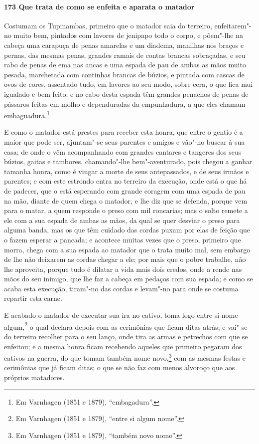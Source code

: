 \paragraph{173 Que trata de como se enfeita e aparata o matador}

Costumam os Tupinambas, primeiro que o matador saia do terreiro, enfeitarem"-no muito bem,
pintados com lavores de jenipapo todo o corpo, e põem"-lhe na cabeça uma carapuça de penas
amarelas e um diadema, manilhas nos braços e pernas, das mesmas penas, grandes ramais de
contas brancas sobraçadas, e seu rabo de penas de ema nas ancas e uma espada de pau de
ambas as mãos muito pesada, marchetada com continhas brancas de búzios, e pintada com
cascas de ovos de cores, assentado tudo, em lavores ao seu modo, sobre cera, o que fica
mui igualado e bem feito; e no cabo desta espada têm grandes penachos de penas de pássaros
feitas em molho e dependuradas da empunhadura, a que eles chamam embaguadura.\footnote{ Em
Varnhagen (1851 e 1879), ``embagadura''.}

E como o matador está prestes para receber esta honra, que entre o gentio é a maior que
pode ser, ajuntam"-se seus parentes e amigos e vão"-no buscar à sua casa; de onde o vêm
acompanhando com grandes cantares e tangeres dos seus búzios, gaitas e tambores,
chamando"-lhe bem"-aventurado, pois chegou a ganhar tamanha honra, como é vingar a morte de
seus antepassados, e de seus irmãos e parentes; e com este estrondo entra no terreiro da
execução, onde está o que há de padecer, que o está esperando com grande coragem com uma
espada de pau na mão, diante de quem chega o matador, e lhe diz que se defenda, porque vem
para o matar, a quem responde o preso com mil roncarias; mas o solto remete a ele com a
sua espada de ambas as mãos, da qual se quer desviar o preso para alguma banda, mas os que
têm cuidado das cordas puxam por elas de feição que o fazem esperar a pancada; e acontece
muitas vezes que o preso, primeiro que morra, chega com a sua espada ao matador que o
trata muito mal, sem embargo de lhe não deixarem as cordas chegar a ele; por mais que o
pobre trabalhe, não lhe aproveita, porque tudo é dilatar a vida mais dois credos, onde a
rende nas mãos do seu inimigo, que lhe faz a cabeça em pedaços com sua espada; e como se
acaba esta execução, tiram"-no das cordas e levam"-no para onde se costuma repartir esta
carne.

E acabado o matador de executar sua ira no cativo, toma logo entre si nome
algum,\footnote{ Em Varnhagen (1851 e 1879), ``entre si algum nome''.} o qual declara
depois com as cerimônias que ficam ditas atrás; e vai"-se do terreiro recolher para o seu
lanço, onde tira as armas e petrechos com que se enfeitou; e a mesma honra ficam recebendo
aqueles que primeiro pegaram dos cativos na guerra, do que tomam também nome
novo,\footnote{ Em Varnhagen (1851 e 1879), ``também novo nome''.} com as mesmas festas e
cerimônias que já ficam ditas; o que se não faz com menos alvoroço que aos próprios
matadores.

